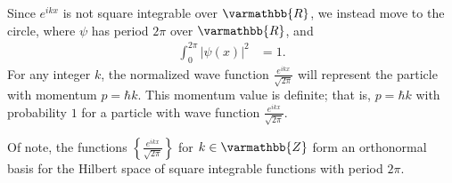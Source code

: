 \documentclass[12pt]{extarticle}
\newcommand{\Z}{\varmathbb{Z}}
\newcommand{\R}{\varmathbb{R}}
\newcommand{\set}[1]{\left\{#1\right\}}
\theoremstyle{plain}
\theoremstyle{definition}
\theoremstyle{remark}
\renewcommand{\newline}{\hfill\break}
\begin{document}
  Since $e^{ikx}$ is not square integrable over $\R$, we instead move to the circle, where $\psi$ has period $2\pi$ over $\R$, and
  \begin{align*}
    \int_{0}^{2\pi}\left\vert \psi(x) \right\vert^2 &= 1.
  \end{align*}
  For any integer $k$, the normalized wave function $\frac{e^{ikx}}{\sqrt{2\pi}}$ will represent the particle with momentum $p = \hbar k$. This momentum value is definite; that is, $p = \hbar k$ with probability $1$ for a particle with wave function $\frac{e^{ikx}}{\sqrt{2\pi}}$.\newline

  Of note, the functions $\set{\frac{e^{ikx}}{\sqrt{2\pi}}}$ for $k\in \Z$ form an orthonormal basis for the Hilbert space of square integrable functions with period $2\pi$.\newline
\end{document}
